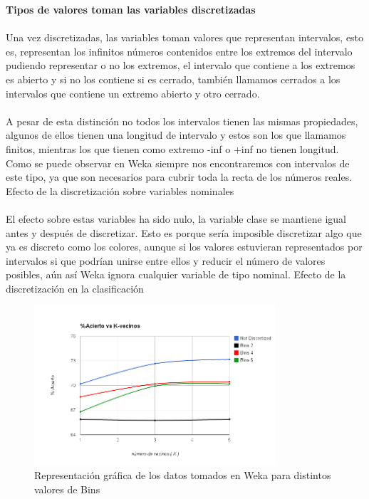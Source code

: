 \documentclass[es]{ifirak}
\begin{document}
\textbf{Tipos de valores toman las variables discretizadas}
\paragraph{}
Una vez discretizadas, las variables toman valores que representan intervalos, esto es, representan los infinitos números contenidos entre los extremos del intervalo pudiendo representar o no los extremos, el intervalo que contiene a los extremos es abierto y si no los contiene si es cerrado, también llamamos cerrados a los intervalos que contiene un extremo abierto y otro cerrado. 
\paragraph{}
A pesar de esta distinción no todos los intervalos tienen las mismas propiedades, algunos de ellos tienen una longitud de intervalo y estos son los que llamamos finitos, mientras los que tienen como extremo -inf o +inf no tienen longitud. Como se puede observar en Weka siempre nos encontraremos con intervalos de este tipo, ya que son necesarios para cubrir toda la recta de los números reales.
Efecto de la discretización sobre variables nominales
\paragraph{}
El efecto sobre estas variables ha sido nulo, la variable clase se mantiene igual antes y después de discretizar. Esto es porque sería imposible discretizar algo que ya es discreto como los colores, aunque si los valores estuvieran representados por intervalos si que podrían unirse entre ellos y reducir el número de valores posibles, aún así Weka ignora cualquier variable de tipo nominal.
Efecto de la discretización en la clasificación

\begin{figure}[htbp]
\centering
\includegraphics[width=0.8\textwidth]{image.png}
\caption{Representación gráfica de los datos tomados en Weka para distintos valores de Bins}\label{figure}
\end{figure}
\end{document}
